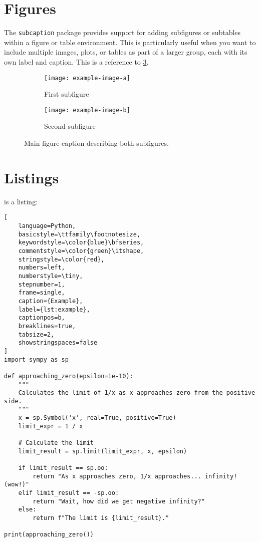 \section{Figures}
The \texttt{subcaption} package provides support for adding subfigures or subtables within a figure or table environment. 
This is particularly useful when you want to include multiple images, plots, or tables as part of a larger group, each with its own label and caption. 
This is a reference to \cref{fig:mainfig}.
\begin{figure}[ht]
    \centering
    \begin{subfigure}{0.45\textwidth}
        \centering
        \texttt{[image: example-image-a]}
        \caption{First subfigure}
        \label{fig:subfig1}
    \end{subfigure}
    \begin{subfigure}{0.45\textwidth}
        \centering
        \texttt{[image: example-image-b]}
        \caption{Second subfigure}
        \label{fig:subfig2}
    \end{subfigure}
    \caption{Main figure caption describing both subfigures.}
    \label{fig:mainfig}
\end{figure}

\section{Listings}
 is a listing:
\begin{lstlisting}[
    language=Python,
    basicstyle=\ttfamily\footnotesize,
    keywordstyle=\color{blue}\bfseries, 
    commentstyle=\color{green}\itshape, 
    stringstyle=\color{red},            
    numbers=left,
    numberstyle=\tiny,
    stepnumber=1,
    frame=single,
    caption={Example},
    label={lst:example},
    captionpos=b,
    breaklines=true,
    tabsize=2,
    showstringspaces=false
]
import sympy as sp

def approaching_zero(epsilon=1e-10):
    """
    Calculates the limit of 1/x as x approaches zero from the positive side.
    """
    x = sp.Symbol('x', real=True, positive=True)
    limit_expr = 1 / x

    # Calculate the limit
    limit_result = sp.limit(limit_expr, x, epsilon)

    if limit_result == sp.oo:
        return "As x approaches zero, 1/x approaches... infinity! (wow!)"
    elif limit_result == -sp.oo:
        return "Wait, how did we get negative infinity?"
    else:
        return f"The limit is {limit_result}."

print(approaching_zero())
\end{lstlisting}

